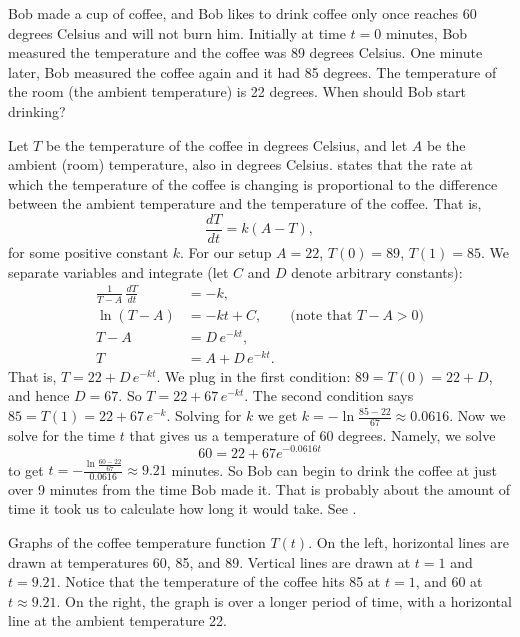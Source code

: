 \begin{example} \label{sep:coffeeexample}
Bob made a cup of coffee, and
Bob likes to drink coffee only once reaches 60 degrees Celsius and will not burn him.
Initially at time $t=0$ minutes,
Bob measured the temperature and the coffee was 89 degrees Celsius.
One minute later, Bob measured the coffee again and it had 85 degrees.
The temperature of the room (the ambient temperature) is 22 degrees.
When should Bob start drinking?

Let $T$ be the temperature of the coffee in degrees Celsius, and let $A$ be
the ambient (room) temperature, also in degrees Celsius.
 states that the rate at which the
temperature of the coffee is changing
is proportional to the difference between the
ambient temperature and the temperature of the coffee.  That is,
\begin{equation*}
\frac{dT}{dt} = k(A-T) ,
\end{equation*}
for some positive constant $k$.
For our setup $A=22$, $T(0) = 89$, $T(1) = 85$.
We separate variables and integrate (let $C$ and $D$ denote arbitrary
constants):
\begin{align*}
\frac{1}{T-A} \, \frac{dT}{dt} & = -k , \\
\ln (T-A) &= -kt + C , \qquad \text{(note that } T-A > 0 \text{)} \\
T-A &= D\, e^{-kt} ,  \\
T &= A + D\, e^{-kt} .
\end{align*}
That is,
$T = 22 + D\, e^{-kt}$.  We plug in the first condition: $89 = T(0) = 22 +
D$,
and hence $D = 67$.  So
$T = 22 + 67\, e^{-kt}$.  The second condition says $85 = T(1) = 
22 + 67\, e^{-k}$.  Solving for $k$ we get
$k = - \ln \frac{85-22}{67} \approx 0.0616$.  Now we solve for the time $t$
that gives us a temperature of 60 degrees.  Namely, we solve
\begin{equation*}
60 = 22 + 67 e^{-0.0616t}
\end{equation*}
to get
$t = - \frac{\ln \frac{60-22}{67}}{0.0616} \approx 9.21$ minutes.  So Bob can
begin to drink the coffee at just over 9 minutes from the time Bob made
it.  That is probably about the amount of time it took us to calculate how long
it would take.  See .
\begin{myfig}
\capstart
\caption{Graphs of the coffee temperature function $T(t)$.
On the left, horizontal
lines are drawn at temperatures 60, 85, and 89.  Vertical lines
are drawn at $t=1$ and $t=9.21$.  Notice that the
temperature of the coffee hits 85 at $t=1$, and 60 at
$t \approx 9.21$.  On the right, the graph is over a longer period of time,
with a horizontal line at the ambient temperature 22.\label{sintro:coffeefig}}
\end{myfig}
\end{example}

